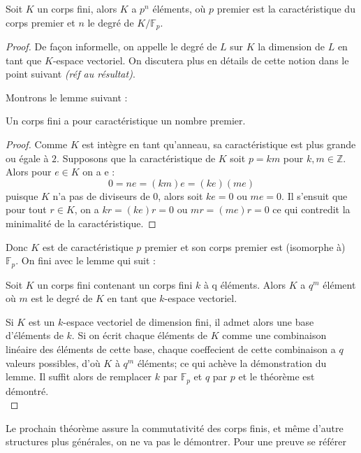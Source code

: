 \documentclass[a4paper]{article} %
\numberwithin{equation}{section}
\newcommand\GF[1]{\mathbb{F}_{#1}}
\begin{document}
\begin{thm}
\label{corfincarprem}
Soit $K$ un corps fini, alors $K$ a $p^n$ éléments, où $p$ premier est la
caractéristique du corps premier et $n$ le degré de $K/\GF{p}$.
\end{thm}
\begin{proof}
De façon informelle, on appelle le degré de $L$ sur $K$ la dimension de $L$
en tant que $K$-espace vectoriel. On discutera plus en détails de cette
notion dans le point suivant \textit{(réf au résultat)}.\par
Montrons le lemme suivant :
\begin{lem}
Un corps fini a pour caractéristique un nombre premier.
\end{lem}
\begin{proof}
Comme $K$ est intègre en tant qu'anneau, sa caractéristique est plus grande ou
égale à $2$. Supposons que la caractéristique de $K$ soit $p = km$ pour $k,
m\in\mathbb{Z}$. Alors pour $e\in K$ on a e :
\[0 = ne = (km)e = (ke)(me)\]
puisque $K$ n'a pas de diviseurs de $0$, alors soit $ke = 0$ ou $me = 0$. Il
s'ensuit que pour tout $r\in K$, on a $kr = (ke)r = 0$ ou $mr = (me)r = 0$ ce
qui contredit la minimalité de la caractéristique.
\end{proof}
Donc $K$ est de caractéristique $p$ premier et son corps premier est (isomorphe
à) $\GF{p}$. On fini avec le lemme qui suit :
\begin{lem}
Soit $K$ un corps fini contenant un corps fini $k$ à q éléments. Alors $K$ a
$q^m$ élément où $m$ est le degré de $K$ en tant que $k$-espace vectoriel.
\end{lem}
Si $K$ est un $k$-espace vectoriel de dimension fini, il admet alors une base
d'éléments de $k$. Si on écrit chaque éléments de $K$ comme une combinaison
linéaire des éléments de cette base, chaque coeffecient de cette combinaison a
$q$ valeurs possibles, d'où $K$ à $q^m$ éléments; ce qui achève la démonstration
du lemme. Il suffit alors de remplacer $k$ par $\GF{p}$ et $q$ par $p$ et le
théorème est démontré.\\
\end{proof}
Le prochain théorème assure la commutativité des corps finis, et même d'autre
structures plus générales, on ne va pas le démontrer. Pour une preuve se référer
\end{document}

